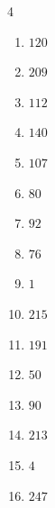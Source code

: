 \begin{multicols}{4}
\begin{enumerate}
  \item $120$


  \item $209$


  \item $112$


  \item $140$


  \item $107$


\columnbreak %

  \item $80$


  \item $92$


  \item $76$


  \item $1$


  \item $215$


  \item $191$


  \item $50$


  \item $90$


  \item $213$


  \item $4$


  \item $247$


\end{enumerate}
\end{multicols}
